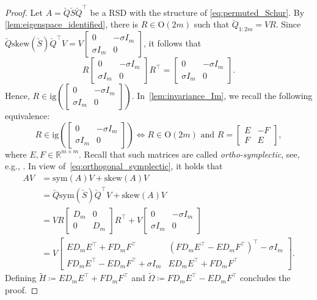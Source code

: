 \documentclass[10pt,twoside,dvipsnames]{siamart1116}
\numberwithin{algorithm}{section}
\numberwithin{equation}{section}
\begin{document}
	\begin{proof}
	  Let $A=\breve{Q}\breve{S}\breve{Q}^\top $ be a RSD with the structure of \eqref{eq:permuted_Schur}.  By \cref{lem:eigenspace_identified}, there is $R\in\mathrm{O}(2m)$ such that $\breve{Q}_{1:2m}=VR$. Since $\breve{Q}\mathrm{skew}(\breve{S})\breve{Q}^\top V = V\left[\begin{smallmatrix}
	0&-\sigma I_m\\
	\sigma I_m&0
	\end{smallmatrix}\right]$, it follows that \begin{equation}
	R\begin{bmatrix}
	0&-\sigma I_m\\
	\sigma I_m&0
	\end{bmatrix}R^\top =\begin{bmatrix}
	0&-\sigma I_m\\
	\sigma I_m&0
	\end{bmatrix}.
\end{equation} Hence, $R\in \mathrm{ig}\left(\left[\begin{smallmatrix}
	0&-\sigma I_m\\
	\sigma I_m&0
	\end{smallmatrix}\right]\right)$. In~\cref{lem:invariance_Im}, we recall the following equivalence:
	\begin{equation}\label{eq:orthogonal_symplectic}
	R\in \mathrm{ig}\left(\begin{bmatrix}
		0&-\sigma I_m\\
		\sigma I_m&0
		\end{bmatrix}\right)\iff R\in\mathrm{O}(2m) \text{ and } R=\begin{bmatrix}
		E&-F\\
		F&E
		\end{bmatrix},
	\end{equation}
	where $E,F\in\mathbb{R}^{m\times m}$. Recall that such matrices are called \emph{ortho-symplectic}, see, e.g., \cite[Eq.~5.1]{dopico09}. In view of~\eqref{eq:orthogonal_symplectic}, it holds that
	\begin{align}
	\nonumber
	AV&=\mathrm{sym}(A) V+\mathrm{skew}(A)V\\
	&=\breve{Q}\mathrm{sym}(\breve{S})\breve{Q}^\top V+\mathrm{skew}(A)V\\
	\nonumber
	&=VR \begin{bmatrix}
	D_m&0\\
	0&D_m
	\end{bmatrix}R^\top  + V\begin{bmatrix}
	0&-\sigma I_m\\
	\sigma I_m& 0
	\end{bmatrix}\\
	\label{eq:symmetric_subproblem}
	&=V\begin{bmatrix}
	ED_mE^\top  + FD_mF^\top  & (FD_mE^\top  - ED_mF^\top )^\top  - \sigma I_m\\
	 FD_mE^\top  - ED_mF^\top +\sigma I_m&ED_mE^\top   + FD_mF^\top 
	\end{bmatrix}.
	\end{align}
	Defining $\widetilde{H} \coloneq ED_mE^\top  + FD_mF^\top $ and $\widetilde{\Omega}\coloneq FD_mE^\top  - ED_mF^\top $ concludes the proof.
	\end{proof}
\end{document}
